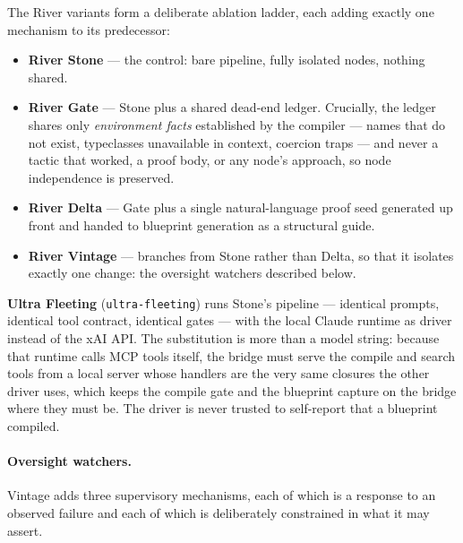 \documentclass[12pt, a4paper]{article}
\begin{document}
The River variants form a deliberate ablation ladder, each adding exactly
one mechanism to its predecessor:

\begin{itemize}[leftmargin=*]
  \item \textbf{River Stone} --- the control: bare pipeline, fully isolated
    nodes, nothing shared.
  \item \textbf{River Gate} --- Stone plus a shared dead-end ledger.
    Crucially, the ledger shares only \emph{environment facts} established by
    the compiler --- names that do not exist, typeclasses unavailable in
    context, coercion traps --- and never a tactic that worked, a proof body,
    or any node's approach, so node independence is preserved.
  \item \textbf{River Delta} --- Gate plus a single natural-language proof
    seed generated up front and handed to blueprint generation as a
    structural guide.
  \item \textbf{River Vintage} --- branches from Stone rather than Delta, so
    that it isolates exactly one change: the oversight watchers described
    below.
\end{itemize}

\textbf{Ultra Fleeting} (\texttt{ultra-fleeting}) runs Stone's pipeline ---
identical prompts, identical tool contract, identical gates --- with the
local Claude runtime as driver instead of the xAI API. The substitution is
more than a model string: because that runtime calls MCP tools itself, the
bridge must serve the compile and search tools from a local server whose
handlers are the very same closures the other driver uses, which keeps the
compile gate and the blueprint capture on the bridge where they must be. The
driver is never trusted to self-report that a blueprint compiled.

\paragraph{Oversight watchers.} Vintage adds three supervisory mechanisms,
each of which is a response to an observed failure and each of which is
deliberately constrained in what it may assert.
\end{document}
